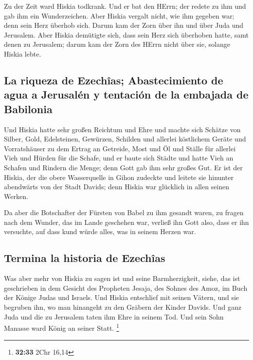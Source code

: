  Zu der Zeit ward Hiskia todkrank. Und er bat den HErrn;
der redete zu ihm und gab ihm ein Wunderzeichen.  Aber
Hiskia vergalt nicht, wie ihm gegeben war; denn sein Herz überhob sich.
Darum kam der Zorn über ihn und über Juda und Jerusalem. 
Aber Hiskia demütigte sich, dass sein Herz sich überhoben hatte, samt
denen zu Jerusalem; darum kam der Zorn des HErrn nicht über sie, solange
Hiskia lebte.

\hypertarget{la-riqueza-de-ezechuxeeas-abastecimiento-de-agua-a-jerusaluxe9n-y-tentaciuxf3n-de-la-embajada-de-babilonia}{%
\subsection{La riqueza de Ezechîas; Abastecimiento de agua a Jerusalén y
tentación de la embajada de
Babilonia}\label{la-riqueza-de-ezechuxeeas-abastecimiento-de-agua-a-jerusaluxe9n-y-tentaciuxf3n-de-la-embajada-de-babilonia}}

 Und Hiskia hatte sehr großen Reichtum und Ehre und
machte sich Schätze von Silber, Gold, Edelsteinen, Gewürzen, Schilden
und allerlei köstlichem Geräte  und Vorratshäuser zu dem
Ertrag an Getreide, Most und Öl und Ställe für allerlei Vieh und Hürden
für die Schafe,  und er baute sich Städte und hatte Vieh
an Schafen und Rindern die Menge; denn Gott gab ihm sehr großes Gut.
 Er ist der Hiskia, der die obere Wasserquelle in Gihon
zudeckte und leitete sie hinunter abendwärts von der Stadt Davids; denn
Hiskia war glücklich in allen seinen Werken.

 Da aber die Botschafter der Fürsten von Babel zu ihm
gesandt waren, zu fragen nach dem Wunder, das im Lande geschehen war,
verließ ihn Gott also, dass er ihn versuchte, auf dass kund würde alles,
was in seinem Herzen war.

\hypertarget{termina-la-historia-de-ezechuxeeas}{%
\subsection{Termina la historia de
Ezechîas}\label{termina-la-historia-de-ezechuxeeas}}

 Was aber mehr von Hiskia zu sagen ist und seine
Barmherzigkeit, siehe, das ist geschrieben in dem Gesicht des Propheten
Jesaja, des Sohnes des Amoz, im Buch der Könige Judas und Israels.
 Und Hiskia entschlief mit seinen Vätern, und sie
begruben ihn, wo man hinangeht zu den Gräbern der Kinder Davids. Und
ganz Juda und die zu Jerusalem taten ihm Ehre in seinem Tod. Und sein
Sohn Manasse ward König an seiner Statt. \footnote{\textbf{32:33} 2Chr
  16,14}

